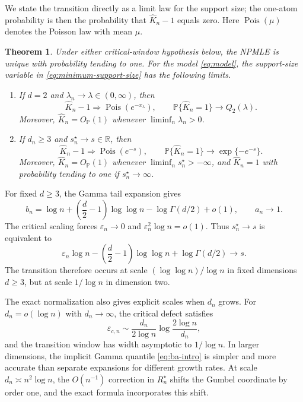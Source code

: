 \documentclass[11pt]{article}
\newtheorem{theorem}{Theorem}[section]
\theoremstyle{remark}
\numberwithin{equation}{section}
\newcommand{\Pbb}{\mathbb P}
\newcommand{\R}{\mathbb R}
\newcommand{\eps}{\varepsilon}
\newcommand{\wh}{\widehat}
\begin{document}
We state the transition directly as a limit law for the support size; the
one-atom probability is then the probability that \(\widehat K_n-1\) equals
zero. Here \(\operatorname{Pois}(\mu)\) denotes the Poisson law with mean
\(\mu\).
\begin{theorem}
\label{thm:main-support-law}
Under either critical-window hypothesis below, the NPMLE is unique with
probability tending to one.  For the model \eqref{eq:model}, the support-size
variable in \eqref{eq:minimum-support-size} has the following limits.
\begin{enumerate}
\item If $d=2$ and $\lambda_n\to\lambda\in(0,\infty)$, then
\begin{equation}
\label{eq:main-d2-support-law}
    \wh K_n-1\Rightarrow\operatorname{Pois}(e^{-x_\lambda}),
    \qquad
    \Pbb\{\wh K_n=1\}\to Q_2(\lambda).
\end{equation}
Moreover, $\wh K_n=O_{\Pbb}(1)$ whenever
$\liminf_n\lambda_n>0$.
\item If $d_n\ge3$ and $s_n^\star\to s\in\R$, then
\begin{equation}
\label{eq:main-highd-support-law}
    \wh K_n-1\Rightarrow\operatorname{Pois}(e^{-s}),
    \qquad
    \Pbb\{\wh K_n=1\}\to\exp\{-e^{-s}\}.
\end{equation}
Moreover, $\wh K_n=O_{\Pbb}(1)$ whenever
$\liminf_n s_n^\star> -\infty$, and $\wh K_n=1$ with probability tending
to one if $s_n^\star\to\infty$.
\end{enumerate}
\end{theorem}

For fixed $d\ge3$, the Gamma tail expansion gives
\[
    b_n=\log n+\left(\frac d2-1\right)\log\log n
        -\log\Gamma(d/2)+o(1),
    \qquad a_n\to1.
\]
The critical scaling forces \(\eps_n\to0\) and
\(\eps_n^2\log n=o(1)\). Thus $s_n^\star\to s$ is equivalent to
\begin{equation}
\label{eq:fixed-d-intro-window}
    \eps_n\log n-\left(\frac d2-1\right)\log\log n
        +\log\Gamma(d/2)\longrightarrow s.
\end{equation}
The transition therefore occurs at scale $(\log\log n)/\log n$ in fixed
dimensions $d\ge3$, but at scale $1/\log n$ in dimension two.

The exact normalization also gives explicit scales when $d_n$ grows. For
$d_n=o(\log n)$ with $d_n\to\infty$, the critical defect satisfies
\begin{equation}
\label{eq:sublog-intro-critical}
    \eps_{c,n}
    \sim\frac{d_n}{2\log n}
       \log\frac{2\log n}{d_n},
\end{equation}
and the transition window has width asymptotic to $1/\log n$. In larger
dimensions, the implicit Gamma quantile \eqref{eq:ba-intro} is simpler and more
accurate than separate expansions for different growth rates. At scale
$d_n\asymp n^2\log n$, the $O(n^{-1})$ correction in $R_n^\star$ shifts the
Gumbel coordinate by order one, and the exact formula incorporates this shift.
\end{document}
